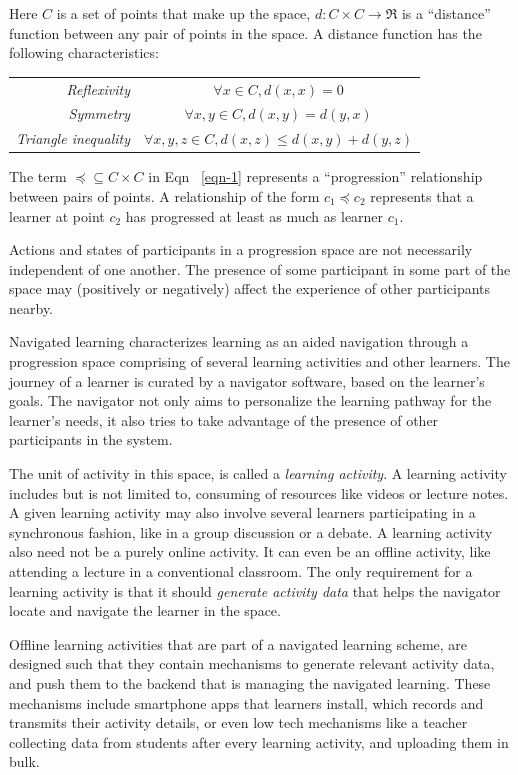 \begin{multicols}{2}
Here $C$ is a set of points that make up the space, $d : C \times C → \Re$ is a “distance” function between any pair of points in the space. A distance function has the following characteristics:

\noindent
\begin{tabular}{@{}r@{~~}c@{}}
\textit{Reflexivity} &  $\forall x \in C, d(x, x) = 0$\\[3pt]
\textit{Symmetry} &  $\forall x, y \in C, d(x, y) = d(y, x)$\\[3pt]
\textit{Triangle inequality} & $\forall x, y, z \in C, d(x, z)\leq d(x, y) + d(y, z)$
\end{tabular}

The term $\preceq \subseteq C \times C$ in Eqn ~\ref{eqn-1} represents a “progression” relationship between pairs of points. A relationship of the form $c_1 \preceq c_2$ represents that a learner at point $c_2$  has progressed at least as much as learner $c_1$. 

Actions and states of participants in a progression space are not necessarily independent of one another. The presence of some participant in some part of the space may (positively or negatively) affect the experience of other participants nearby.

Navigated learning characterizes learning as an aided navigation through a progression space comprising of several learning activities and other learners. The journey of a learner is curated by a navigator software, based on the learner’s goals. The navigator not only aims to personalize the learning pathway for the learner’s needs, it also tries to take advantage of the presence of other participants in the system.

The unit of activity in this space, is called a \textit{learning activity}. A learning activity includes but is not limited to, consuming of resources like videos or lecture notes. A given learning activity may also involve several learners participating in a synchronous fashion, like in a group discussion or a debate. A learning activity also need not be a purely online activity. It can even be an offline activity, like attending a lecture in a conventional classroom. The only requirement for a learning activity is that it should \textit{generate activity data} that helps the navigator locate and navigate the learner in the space.

Offline learning activities that are part of a navigated learning scheme, are designed such that they contain mechanisms to generate relevant activity data, and push them to the backend that is managing the navigated learning. These mechanisms include smartphone apps that learners install, which records and transmits their activity details, or even low tech mechanisms like a teacher collecting data from students after every learning activity, and uploading them in bulk.


\end{multicols}

